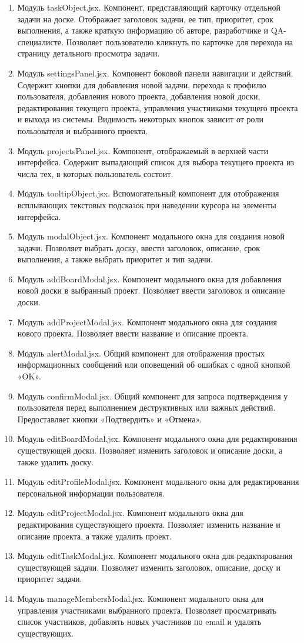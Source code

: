 \begin{enumerate}
	\item Модуль taskObject.jsx. Компонент, представляющий карточку отдельной задачи на доске. Отображает заголовок задачи, ее тип, приоритет, срок выполнения, а также краткую информацию об авторе, разработчике и QA-специалисте. Позволяет пользователю кликнуть по карточке для перехода на страницу детального просмотра задачи.
	\item Модуль settingsPanel.jsx. Компонент боковой панели навигации и действий. Содержит кнопки для добавления новой задачи, перехода к профилю пользователя, добавления нового проекта, добавления новой доски, редактирования текущего проекта, управления участниками текущего проекта и выхода из системы. Видимость некоторых кнопок зависит от роли пользователя и выбранного проекта.
	\item Модуль projectsPanel.jsx. Компонент, отображаемый в верхней части интерфейса. Содержит выпадающий список для выбора текущего проекта из числа тех, в которых пользователь состоит.
	\item Модуль tooltipObject.jsx. Вспомогательный компонент для отображения всплывающих текстовых подсказок при наведении курсора на элементы интерфейса.
	\item Модуль modalObject.jsx. Компонент модального окна для создания новой задачи. Позволяет выбрать доску, ввести заголовок, описание, срок выполнения, а также выбрать приоритет и тип задачи.
	\item Модуль addBoardModal.jsx. Компонент модального окна для добавления новой доски в выбранный проект. Позволяет ввести заголовок и описание доски.
	\item Модуль addProjectModal.jsx. Компонент модального окна для создания нового проекта. Позволяет ввести название и описание проекта.
	\item Модуль alertModal.jsx. Общий компонент для отображения простых информационных сообщений или оповещений об ошибках с одной кнопкой «OK».
	\item Модуль confirmModal.jsx. Общий компонент для запроса подтверждения у пользователя перед выполнением деструктивных или важных действий. Предоставляет кнопки «Подтвердить» и «Отмена».
	\item Модуль editBoardModal.jsx. Компонент модального окна для редактирования существующей доски. Позволяет изменить заголовок и описание доски, а также удалить доску.
	\item Модуль editProfileModal.jsx. Компонент модального окна для редактирования персональной информации пользователя.
	\item Модуль editProjectModal.jsx. Компонент модального окна для редактирования существующего проекта. Позволяет изменить название и описание проекта, а также удалить проект.
	\item Модуль editTaskModal.jsx. Компонент модального окна для редактирования существующей задачи. Позволяет изменить заголовок, описание, доску и приоритет задачи.
	\item Модуль manageMembersModal.jsx. Компонент модального окна для управления участниками выбранного проекта. Позволяет просматривать список участников, добавлять новых участников по email и удалять существующих.
\end{enumerate}

